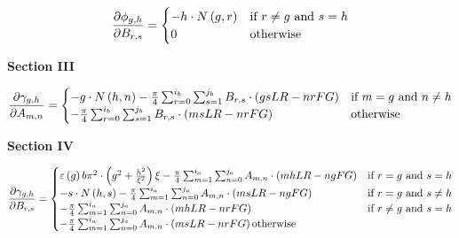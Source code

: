 \begin{equation} \label{4.11)} 
    \frac{\partial \phi_{g,h}}{\partial B_{r,s}} = \begin{cases} -h \cdot N\left(g,r\right) & \text{if } r \ne g \text{ and } s = h \\ 0 & \text{otherwise} \end{cases}
\end{equation}

\textbf{Section III}

\begin{equation} \label{4.12)} 
    \frac{\partial \gamma_{g,h}}{\partial A_{m,n}} = \begin{cases} -g \cdot N\left(h,n\right) 
        - \frac{\pi}{4} \sum _{r=0}^{i_{b} } \sum _{s=1}^{j_{b}} B_{r,s} 
        \cdot \left(gsLR - nrFG\right) & \text{if } m = g \text{ and } n \ne h \\ -\frac{\pi }{4} \sum _{r=0}^{i_{b} } \sum _{s=1}^{j_{b}} B_{r,s} 
        \cdot \left(msLR - nrFG\right) & \text{otherwise} \end{cases}
\end{equation}

\textbf{Section IV}

\begin{equation} \label{4.13)} 
    \frac{\partial \gamma_{g,h}}{\partial B_{r,s}} = 
    \begin{cases} 
    \varepsilon \left(g\right)b\pi ^{2} 
            \cdot \left(g^{2} + \frac{h^{2} }{\xi ^{2} } \right) \xi 
            - \frac{\pi }{4} \sum _{m=1}^{i_{a} } \sum _{n=0}^{j_{a} } A_{m,n} 
            \cdot \left(mhLR-ngFG\right)   
    & \text{if } r = g \text{ and } s = h \\ 
     -s \cdot N\left(h, s\right) - \frac{\pi }{4} \sum _{m=1}^{i_{a} } \sum _{n=0}^{j_{a} }A_{m,n}
            \cdot \left(msLR - ngFG\right)
    & \text{if } r = g \text{ and } s \ne h \\
     -\frac{\pi }{4} \sum _{m=1}^{i_{a} } \sum _{n=0}^{j_{a}} A_{m,n} 
            \cdot \left(mhLR - nrFG\right)
    & \text{if } r \ne g \text{ and } s = h \\ 
     -\frac{\pi }{4} \sum _{m=1}^{i_{a} } \sum _{n=0}^{j_{a}} A_{m,n} 
            \cdot \left(msLR - nrFG\right)
    \text{otherwise} \end{cases}
\end{equation} 



